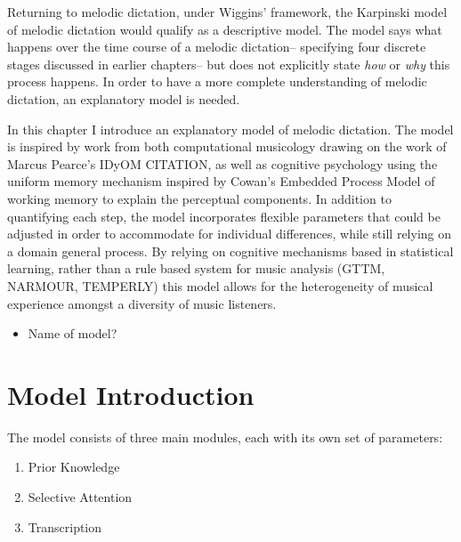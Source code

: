 \documentclass[]{book}
\providecommand{\tightlist}{%
  \setlength{\itemsep}{0pt}\setlength{\parskip}{0pt}}
\theoremstyle{definition}
\theoremstyle{definition}
\theoremstyle{definition}
\theoremstyle{remark}
\begin{document}
Returning to melodic dictation, under Wiggins' framework, the Karpinski
model of melodic dictation
\citep{karpinskiAuralSkillsAcquisition2000, karpinskiModelMusicPerception1990}
would qualify as a descriptive model. The model says what happens over
the time course of a melodic dictation-- specifying four discrete stages
discussed in earlier chapters-- but does not explicitly state \emph{how}
or \emph{why} this process happens. In order to have a more complete
understanding of melodic dictation, an explanatory model is needed.

In this chapter I introduce an explanatory model of melodic dictation.
The model is inspired by work from both computational musicology drawing
on the work of Marcus Pearce's IDyOM CITATION, as well as cognitive
psychology using the uniform memory mechanism inspired by Cowan's
Embedded Process Model of working memory to explain the perceptual
components. In addition to quantifying each step, the model incorporates
flexible parameters that could be adjusted in order to accommodate for
individual differences, while still relying on a domain general process.
By relying on cognitive mechanisms based in statistical learning, rather
than a rule based system for music analysis (GTTM, NARMOUR, TEMPERLY)
this model allows for the heterogeneity of musical experience amongst a
diversity of music listeners.

\begin{itemize}
\tightlist
\item
  Name of model?
\end{itemize}

\hypertarget{model-introduction}{%
\section{Model Introduction}\label{model-introduction}}

The model consists of three main modules, each with its own set of
parameters:

\begin{enumerate}
\def\labelenumi{\arabic{enumi}.}
\tightlist
\item
  Prior Knowledge
\item
  Selective Attention
\item
  Transcription
\end{enumerate}
\end{document}
